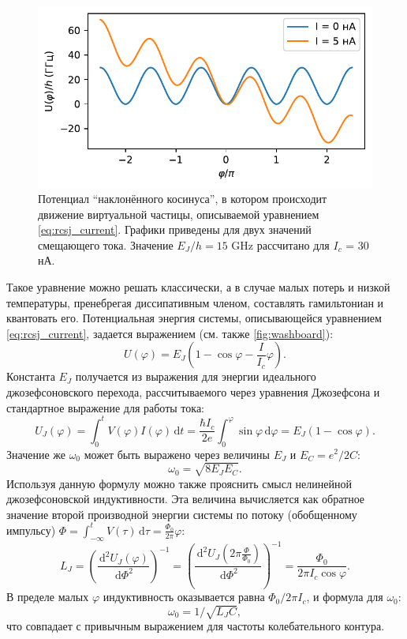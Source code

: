 \documentclass[14pt, a4paper]{extreport}
\newcommand{\diff}{\,\mathrm{d}}
\numberwithin{equation}{section}
\begin{document}
\begin{figure}[t]
	\centering
	\includegraphics[width=0.7\linewidth]{Pictures/washboard}
	\caption{Потенциал ``наклонённого косинуса'', в котором происходит движение виртуальной частицы, описываемой уравнением \eqref{eq:rcsj_current}. Графики приведены для двух значений смещающего тока. Значение $E_J/h = 15$ GHz рассчитано для $I_c$ = 30 нА.}
	\label{fig:washboard}
\end{figure}

Такое уравнение можно решать классически, а в случае малых потерь и низкой температуры, пренебрегая диссипативным членом, составлять гамильтониан и квантовать его. Потенциальная энергия системы, описывающейся уравнением \eqref{eq:rcsj_current}, задается выражением (см. также \autoref{fig:washboard}):
\begin{equation}
	U(\varphi) = E_J\left(1-\cos \varphi - \frac{I}{I_c}\varphi\right).
\end{equation}
Константа $E_J$ получается из выражения для энергии идеального джозефсоновского перехода, рассчитываемого через уравнения Джозефсона и стандартное выражение для работы тока:
\begin{equation}
	U_J(\varphi) = \int_0^t V(\varphi) I(\varphi) \diff t = \frac{\hbar I_c}{2e}  \int_0^\varphi \sin\varphi \diff\varphi = E_J(1-\cos \varphi).\label{eq:josephson_energy}
\end{equation}
Значение же $\omega_0$ может быть выражено через величины $E_J$ и $E_C = e^2/2C$:
\begin{equation}
	\omega_0 = \sqrt{8 E_J E_C}.
\end{equation}
Используя данную формулу можно также прояснить смысл нелинейной джозефсоновской индуктивности. Эта величина вычисляется как обратное значение второй производной энергии системы по потоку (обобщенному импульсу) $\Phi = \int_{-\infty}^{t} V(\tau) \diff \tau = \frac{\Phi_0}{2\pi} \varphi$:
\begin{equation}
	L_J = \left(\frac{\diff^2 U_J(\varphi)}{\diff \Phi^2}\right)^{-1} = \left(\frac{\diff^2 U_J(2\pi \frac{\Phi}{\Phi_0})}{\diff \Phi^2}\right)^{-1} = \frac{\Phi_0}{2\pi I_c \cos \varphi}.
\end{equation}
В пределе малых $\varphi$ индуктивность оказывается равна $\Phi_0/2\pi I_c$, и формула для $\omega_0$:
\begin{equation}
	\omega_0 = 1/\sqrt{L_J C},
\end{equation}
что совпадает с привычным выражением для частоты колебательного контура.
\end{document}
